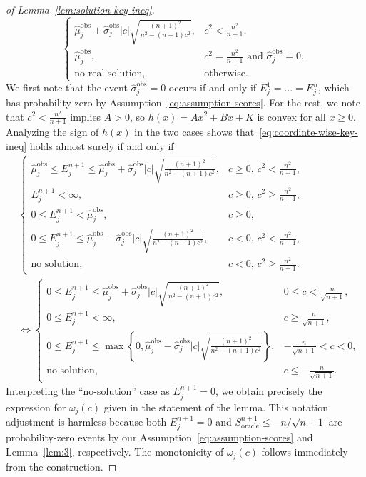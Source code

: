 \begin{proof}[of Lemma~\ref{lem:solution-key-ineq}]
\[\begin{cases}
    \hat{\mu}^\mathrm{obs}_j \pm \hat{\sigma}^\mathrm{obs}_j|c|\sqrt{\tfrac{(n+1)^2}{n^2-(n+1)c^2}}, & c^2 < \tfrac{n^2}{n+1},\\
    \hat{\mu}^\mathrm{obs}_j, & c^2 = \tfrac{n^2}{n+1} \text{ and } \hat{\sigma}^\mathrm{obs}_j = 0,\\
    \text{no real solution}, &\text{otherwise}.
\end{cases}
\]
We first note that the event $\hat{\sigma}^\mathrm{obs}_j = 0$ occurs if and only if $E^1_j=\ldots=E^n_j$, which has probability zero by Assumption~\ref{eq:assumption-scores}. For the rest, we note that $c^2 < \tfrac{n^2}{n+1}$ implies $A>0$, so $h(x) = Ax^2+Bx +K$ is convex for all $x \geq 0$.
Analyzing the sign of $h(x)$ in the two cases shows that~\eqref{eq:coordinte-wise-key-ineq} holds almost surely if and only if
\begin{align*}
    &\begin{cases}
    \hat{\mu}^\mathrm{obs}_j \leq E^{n+1}_j \leq \hat{\mu}^\mathrm{obs}_j+\hat{\sigma}^\mathrm{obs}_j|c|\sqrt{\tfrac{(n+1)^2}{n^2-(n+1)c^2}}, & c \geq 0,\, c^2 < \tfrac{n^2}{n+1}, \\[0.5em]
    E^{n+1}_j < \infty , & c \geq 0,\, c^2 \geq \tfrac{n^2}{n+1}, \\[0.5em]
    0 \leq E^{n+1}_j < \hat{\mu}^\mathrm{obs}_j, & c \geq 0, \\[0.5em]
    0\leq E^{n+1}_j \leq \hat{\mu}^\mathrm{obs}_j-\hat{\sigma}^\mathrm{obs}_j|c|\sqrt{\tfrac{(n+1)^2}{n^2-(n+1)c^2}}, & c < 0,\, c^2 < \tfrac{n^2}{n+1}, \\[0.5em]
    \text{no solution}, & c < 0,\, c^2 \geq \tfrac{n^2}{n+1}.
    \end{cases}\\
    &\iff \begin{cases}
    0 \leq E^{n+1}_j \leq \hat{\mu}^\mathrm{obs}_j+\hat{\sigma}^\mathrm{obs}_j|c|\sqrt{\tfrac{(n+1)^2}{n^2-(n+1)c^2}}, & 0\leq c < \tfrac{n}{\sqrt{n+1}}, \\[0.5em]
    0\leq E^{n+1}_j < \infty , & c\geq\tfrac{n}{\sqrt{n+1}}, \\[0.5em]
    0\leq E^{n+1}_j \leq \max\left\{0, \hat{\mu}^\mathrm{obs}_j-\hat{\sigma}^\mathrm{obs}_j|c|\sqrt{\tfrac{(n+1)^2}{n^2-(n+1)c^2}}\right\}, & -\tfrac{n}{\sqrt{n+1}} < c<0, \\[0.5em]
    \text{no solution}, & c \leq - \tfrac{n}{\sqrt{n+1}}.
    \end{cases}
\end{align*}
Interpreting the ``no-solution'' case as $E^{n+1}_j = 0$, we obtain precisely the expression for $\omega_j(c)$ given in the statement of the lemma. This notation adjustment is harmless because both $E^{n+1}_j = 0$ and $S^{n+1}_{\mathrm{oracle}} \leq -n/\sqrt{n+1}$ are probability-zero events by our Assumption~\ref{eq:assumption-scores} and Lemma~\ref{lem:3}, respectively.
The monotonicity of $\omega_j(c)$ follows immediately from the construction.
\end{proof}

